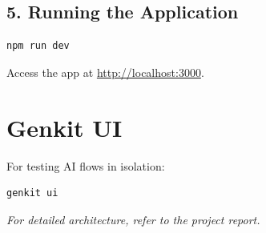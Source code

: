 \documentclass[12pt,a4paper]{article}
\begin{document}
\subsection{5. Running the Application}
\begin{lstlisting}[language=bash]
npm run dev
\end{lstlisting}
Access the app at \url{http://localhost:3000}.

\section{Genkit UI}
For testing AI flows in isolation:
\begin{lstlisting}[language=bash]
genkit ui
\end{lstlisting}

\vfill
\begin{center}
    \textit{For detailed architecture, refer to the project report.}
\end{center}
\end{document}
